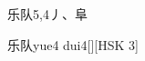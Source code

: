 \begin{entry}{乐队}{5,4}{⼃、⾩}
  \begin{phonetics}{乐队}{yue4 dui4}[][HSK 3]
  \end{phonetics}
\end{entry}
